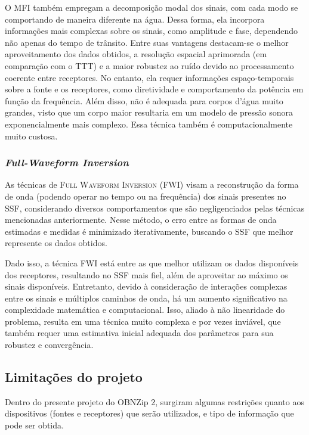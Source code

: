 O MFI também empregam a decomposição modal dos sinais, com cada modo se comportando de maneira diferente na água. Dessa forma, ela incorpora informações mais complexas sobre os sinais, como amplitude e fase, dependendo não apenas do tempo de trânsito. Entre suas vantagens destacam-se o melhor aproveitamento dos dados obtidos, a resolução espacial aprimorada (em comparação com o TTT) e a maior robustez ao ruído devido ao processamento coerente entre receptores. No entanto, ela requer informações espaço-temporais sobre a fonte e os receptores, como diretividade e comportamento da potência em função da frequência. Além disso, não é adequada para corpos d'água muito grandes, visto que um corpo maior resultaria em um modelo de pressão sonora exponencialmente mais complexo. Essa técnica também é computacionalmente muito custosa.

\subsubsection*{\textsl{Full-Waveform Inversion}}

As técnicas de \textsc{Full Waveform Inversion} (FWI) \cite{virieux_overview_2009,fichtner_multiscale_2013} visam a reconstrução da forma de onda (podendo operar no tempo ou na frequência) dos sinais presentes no SSF, considerando diversos comportamentos que são negligenciados pelas técnicas mencionadas anteriormente. Nesse método, o erro entre as formas de onda estimadas e medidas é minimizado iterativamente, buscando o SSF que melhor represente os dados obtidos.

Dado isso, a técnica FWI está entre as que melhor utilizam os dados disponíveis dos receptores, resultando no SSF mais fiel, além de aproveitar ao máximo os sinais disponíveis. Entretanto, devido à consideração de interações complexas entre os sinais e múltiplos caminhos de onda, há um aumento significativo na complexidade matemática e computacional. Isso, aliado à não linearidade do problema, resulta em uma técnica muito complexa e por vezes inviável, que também requer uma estimativa inicial adequada dos parâmetros para sua robustez e convergência.

\subsection{Limitações do projeto}

Dentro do presente projeto do OBNZip 2, surgiram algumas restrições quanto aos dispositivos (fontes e receptores) que serão utilizados, e tipo de informação que pode ser obtida.


